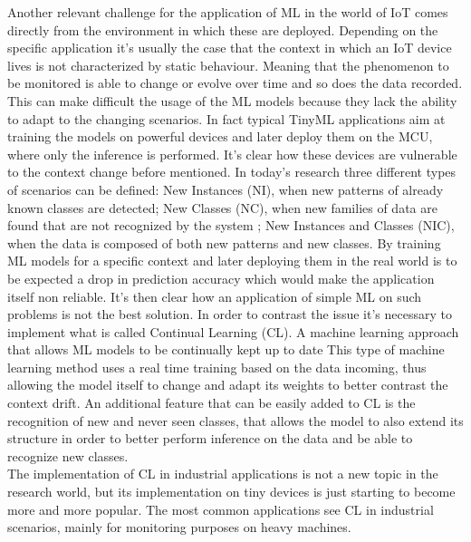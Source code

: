 \documentclass[12pt]{report}
\begin{document}
Another relevant challenge for the application of ML in the world of IoT comes directly from the environment in which these are deployed. Depending on the specific application it's usually the case that the context in which an IoT device lives is not characterized by static behaviour. Meaning that the phenomenon to be monitored is able to change or evolve over time and so does the data recorded. This can make difficult the usage of the ML models because they lack the ability to adapt to the changing scenarios. In fact typical TinyML applications aim at training the models on powerful devices and later deploy them on the MCU, where only the inference is performed. It's clear how these devices are vulnerable to the context change before mentioned. In today's research three different types of scenarios can be defined: New Instances (NI), when new patterns of already known classes are detected; New Classes (NC), when new families of data are found that are not recognized by the system ; New Instances and Classes (NIC), when the data is composed of both new patterns and new classes.
By training ML models for a specific context and later deploying them in the real world is to be expected a drop in prediction accuracy which would make the application itself non reliable. It's then clear how an application of simple ML on such problems is not the best solution. In order to contrast the issue it's necessary to implement what is called Continual Learning (CL). A machine learning approach that allows ML models to be continually kept up to date
This type of machine learning method uses a real time training based on the data incoming, thus allowing the model itself to change and adapt its weights to better contrast the context drift. An additional feature that can be easily added to CL is the recognition of new and never seen classes, that allows the model to also extend its structure in order to better perform inference on the data and be able to recognize new classes. \\
The implementation of CL in industrial applications is not a new topic in the research world, but its implementation on tiny devices is just starting to become more and more popular. The most common applications see CL in industrial scenarios, mainly for monitoring purposes on heavy machines.
\end{document}
